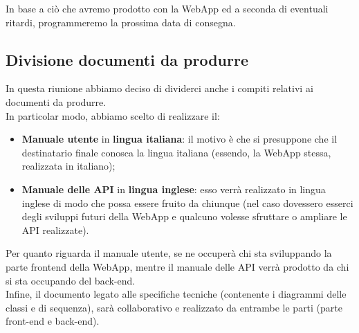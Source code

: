 In base a ciò che avremo prodotto con la WebApp ed a seconda di eventuali ritardi, programmeremo la prossima data di consegna.

\subsection{Divisione documenti da produrre}

In questa riunione abbiamo deciso di dividerci anche i compiti relativi ai documenti da produrre. \\ 
In particolar modo, abbiamo scelto di realizzare il: 
\begin{itemize}
 	\item{\textbf{Manuale utente} in \textbf{lingua italiana}: il motivo è che si presuppone che il destinatario finale conosca la lingua italiana (essendo, la WebApp stessa, realizzata in italiano);}
 	\item{\textbf{Manuale delle API} in \textbf{lingua inglese}: esso verrà realizzato in lingua inglese di modo che possa essere fruito da chiunque (nel caso dovessero esserci degli sviluppi futuri della WebApp e qualcuno volesse sfruttare o ampliare le API realizzate).}
\end{itemize}

Per quanto riguarda il manuale utente, se ne occuperà chi sta sviluppando la parte frontend della WebApp, mentre il manuale delle API verrà prodotto da chi si sta occupando del back-end. \\

Infine, il documento legato alle specifiche tecniche (contenente i diagrammi delle classi e di sequenza), sarà collaborativo e realizzato da entrambe le parti (parte front-end e back-end).

